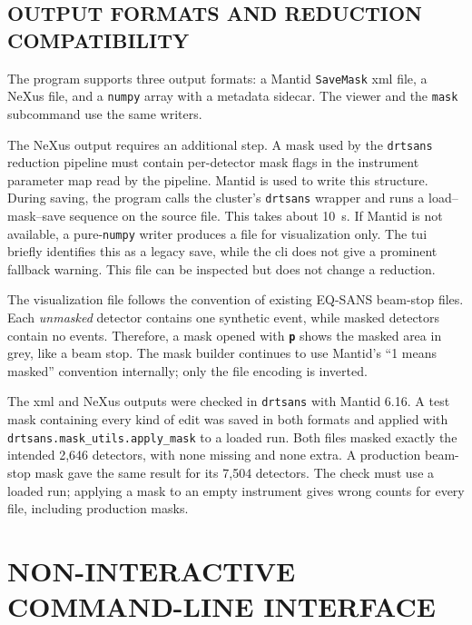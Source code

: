 \documentclass[tm]{ornltm}
\newcommand{\key}[1]{\textbf{\texttt{#1}}}
\begin{document}
\subsection{OUTPUT FORMATS AND REDUCTION COMPATIBILITY}
\label{sec:maskformats}

The program supports three output formats: a Mantid \texttt{SaveMask} \ac{xml}
file, a NeXus file, and a \texttt{numpy} array with a metadata sidecar. The
viewer and the \texttt{mask} subcommand use the same writers.

The NeXus output requires an additional step. A mask used by the
\texttt{drtsans} reduction pipeline must contain per-detector mask flags in the
instrument parameter map read by the pipeline. Mantid is used to write this
structure. During saving, the program calls the cluster's \texttt{drtsans}
wrapper and runs a load--mask--save sequence on the source file. This takes
about 10~s. If Mantid is not
available, a pure-\texttt{numpy} writer produces a file for visualization only.
The \ac{tui} briefly identifies this as a legacy save, while the \ac{cli} does
not give a prominent fallback warning. This file can be inspected but does not
change a reduction.

The visualization file follows the convention of existing EQ-SANS beam-stop
files. Each \emph{unmasked} detector contains one synthetic event, while masked
detectors contain no events. Therefore, a mask opened with \key{p} shows the
masked area in grey, like a beam stop. The mask builder continues to use
Mantid's ``1 means masked'' convention internally; only the file encoding is
inverted.

The \ac{xml} and NeXus outputs were checked in \texttt{drtsans} with Mantid
6.16. A test mask containing every kind of edit was saved in both formats and
applied with \texttt{drtsans.mask\_utils.apply\_mask} to a loaded run. Both
files masked exactly the intended 2,646 detectors, with none missing and none
extra. A production beam-stop mask gave the same result for its 7,504
detectors. The check must use a loaded run; applying a mask to an empty
instrument gives wrong counts for every file, including production masks.

\section{NON-INTERACTIVE COMMAND-LINE INTERFACE}
\label{sec:cli}
\end{document}
